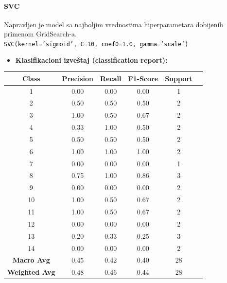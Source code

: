 \documentclass{article}
\begin{document}
\newpage



\paragraph{SVC} 
\begin{flushleft}

Napravljen je model sa najboljim vrednostima hiperparametara  dobijenih primenom GridSearch-a. \\
\texttt{SVC(kernel='sigmoid', C=10, coef0=1.0, gamma='scale')}

\begin{itemize}
\item \textbf{Klasifikacioni izveštaj (classification report):}
\end{itemize}

\begin{table}[ht]
    \centering
    \begin{tabular}{cccccc}
        \textbf{Class} & \textbf{Precision} & \textbf{Recall} & \textbf{F1-Score} & \textbf{Support} \\
        \hline
        1 & 0.00 & 0.00 & 0.00 & 1 \\
        2 & 0.50 & 0.50 & 0.50 & 2 \\
        3 & 1.00 & 0.50 & 0.67 & 2 \\
        4 & 0.33 & 1.00 & 0.50 & 2 \\
        5 & 0.50 & 0.50 & 0.50 & 2 \\
        6 & 1.00 & 1.00 & 1.00 & 2 \\
        7 & 0.00 & 0.00 & 0.00 & 1 \\
        8 & 0.75 & 1.00 & 0.86 & 3 \\
        9 & 0.00 & 0.00 & 0.00 & 2 \\
        10 & 1.00 & 0.50 & 0.67 & 2 \\
        11 & 1.00 & 0.50 & 0.67 & 2 \\
        12 & 0.00 & 0.00 & 0.00 & 2 \\
        13 & 0.20 & 0.33 & 0.25 & 3 \\
        14 & 0.00 & 0.00 & 0.00 & 2 \\
        \hline
        \textbf{Macro Avg} & 0.45 & 0.42 & 0.40 & 28 \\
        \textbf{Weighted Avg} & 0.48 & 0.46 & 0.44 & 28 \\
    \end{tabular}
    \label{tab:classification-report-svc}
\end{table}


\end{flushleft}
\end{document}
